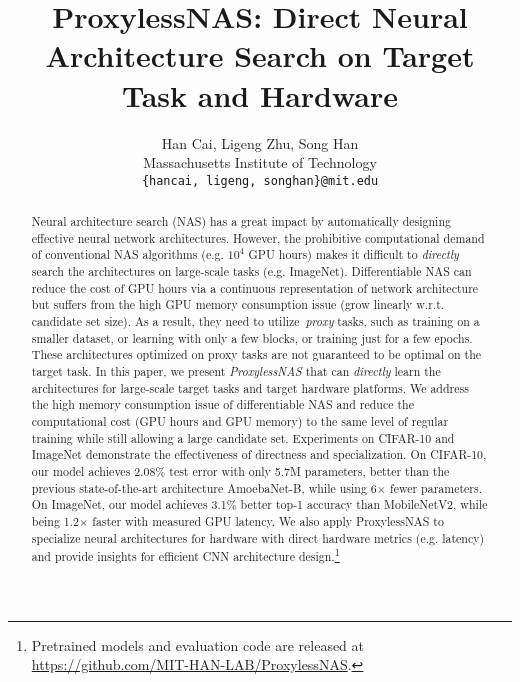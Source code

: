 \documentclass{article} \usepackage{iclr2019_conference,times}
\title{ProxylessNAS: Direct Neural Architecture Search on Target Task and Hardware}
\author{Han Cai, Ligeng Zhu, Song Han \\
Massachusetts Institute of Technology \\
\texttt{\{hancai, ligeng, songhan\}@mit.edu} \\
}
\begin{document}
\maketitle

\begin{abstract}
Neural architecture search (NAS) has a great impact by automatically designing effective neural network architectures. However, the prohibitive computational demand of conventional NAS algorithms (e.g. $10^4$ GPU hours) makes it difficult to \emph{directly} search the architectures on large-scale tasks (e.g. ImageNet). Differentiable NAS can reduce the cost of GPU hours via a continuous representation of network architecture but suffers from the high GPU memory consumption issue (grow linearly w.r.t. candidate set size). As a result, they need to utilize~\emph{proxy} tasks, such as training on a smaller dataset, or learning with only a few blocks, or training just for a few epochs. These architectures optimized on proxy tasks are not guaranteed to be optimal on the target task. 
In this paper, we present \emph{ProxylessNAS} that can \emph{directly} learn the architectures for large-scale target tasks and target hardware platforms.  
We address the high memory consumption issue of differentiable NAS and reduce the computational cost (GPU hours and GPU memory) to the same level of regular training while still allowing a large candidate set. 
Experiments on CIFAR-10 and ImageNet demonstrate the effectiveness of directness and specialization. On CIFAR-10, our model achieves 2.08\% test error with only 5.7M parameters, better than the previous state-of-the-art architecture AmoebaNet-B, while using 6$\times$ fewer parameters. On ImageNet, our model achieves 3.1\% better top-1 accuracy than MobileNetV2, while being 1.2$\times$ faster with measured GPU latency. 
We also apply ProxylessNAS to specialize neural architectures for hardware with direct hardware metrics (e.g. latency) and provide insights for efficient CNN architecture design.\footnote{Pretrained models and evaluation code are released at \href{https://github.com/MIT-HAN-LAB/ProxylessNAS}{https://github.com/MIT-HAN-LAB/ProxylessNAS}.}
\end{abstract}
\end{document}
